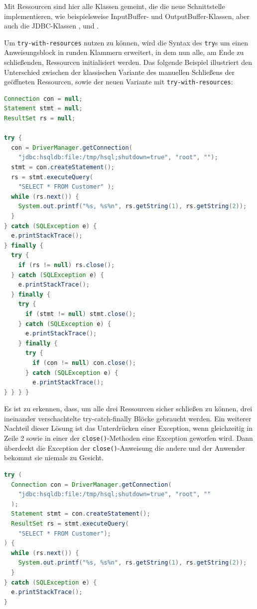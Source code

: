 \documentclass[times, 10pt,twocolumn]{article}
\begin{document}
Mit Ressourcen sind hier alle Klassen gemeint, die die neue Schnittstelle  implementieren, wie beispielsweise
InputBuffer- und OutputBuffer-Klassen, aber auch die JDBC-Klassen ,  und .

Um \texttt{try-with-resources} nutzen zu können, wird die Syntax des \texttt{try}s um einen Anweisungsblock in runden Klammern erweitert,
in dem nun alle, am Ende zu schließenden, Ressourcen initialisiert werden. Das folgende Beispiel illustriert den Unterschied zwischen der
klassischen Variante des manuellen Schließens der geöffneten Ressourcen, sowie der neuen Variante mit \texttt{try-with-resources}:

\begin{lstlisting}[language=java,breaklines=true]
Connection con = null;
Statement stmt = null;
ResultSet rs = null;

try {
  con = DriverManager.getConnection(
	"jdbc:hsqldb:file:/tmp/hsql;shutdown=true", "root", "");
  stmt = con.createStatement();
  rs = stmt.executeQuery(
    "SELECT * FROM Customer" );
  while (rs.next()) {
	System.out.printf("%s, %s%n", rs.getString(1), rs.getString(2));
  }
} catch (SQLException e) {
  e.printStackTrace();
} finally {
  try {
	if (rs != null) rs.close();
  } catch (SQLException e) {
	e.printStackTrace();
  } finally {
	try {
	  if (stmt != null)	stmt.close();
	} catch (SQLException e) {
	  e.printStackTrace();
	} finally {
	  try {
		if (con != null) con.close();
	  } catch (SQLException e) {
		e.printStackTrace();
} } } }
\end{lstlisting}

Es ist zu erkennen, dass, um alle drei Ressourcen sicher schließen zu können, drei ineinander verschachtelte try-catch-finally Blöcke
gebraucht werden. Ein weiterer Nachteil dieser Lösung ist das Unterdrücken einer Exception, wenn gleichzeitig in Zeile 2 sowie in einer
der \texttt{close()}-Methoden eine Exception geworfen wird. Dann überdeckt die Exception der \texttt{close()}-Anweisung die andere und der
Anwender bekommt sie niemals zu Gesicht.\cite{javainsel2}

\begin{lstlisting}[language=java,breaklines=true]
try (
  Connection con = DriverManager.getConnection(
	"jdbc:hsqldb:file:/tmp/hsql;shutdown=true", "root", ""
  );
  Statement stmt = con.createStatement();
  ResultSet rs = stmt.executeQuery(
    "SELECT * FROM Customer");
) {
  while (rs.next()) {
	System.out.printf("%s, %s%n", rs.getString(1), rs.getString(2));
  }
} catch (SQLException e) {
  e.printStackTrace();
}
\end{lstlisting}
\end{document}
